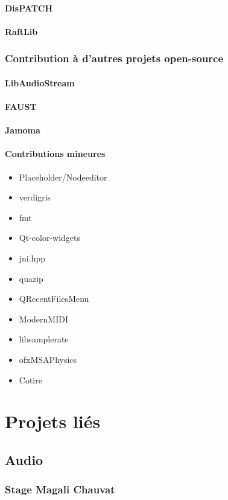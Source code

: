 \documentclass[french,a4paper]{book}
\begin{document}
\paragraph{DisPATCH}
\paragraph{RaftLib}

\subsubsection{Contribution à d'autres projets open-source}
\paragraph{LibAudioStream}
\paragraph{FAUST}
\paragraph{Jamoma}
\paragraph{Contributions mineures}
\begin{itemize}
\item Placeholder/Nodeeditor
\item verdigris
\item fmt
\item Qt-color-widgets
\item jni.hpp
\item quazip
\item QRecentFilesMenu
\item ModernMIDI
\item libsamplerate
\item ofxMSAPhysics
\item Cotire
\end{itemize}

\section{Projets liés}

\subsection{Audio}

\subsubsection{Stage Magali Chauvat}
\end{document}
